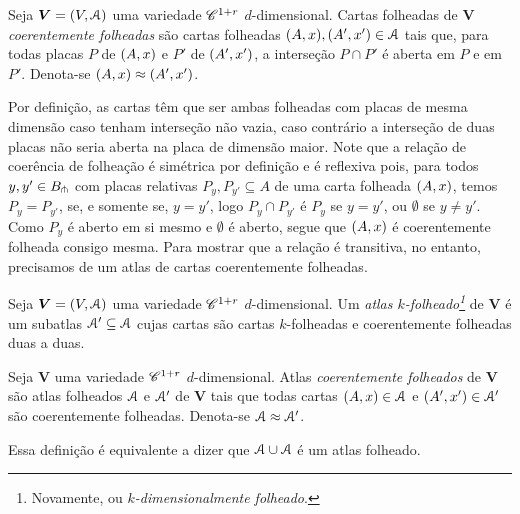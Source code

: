 \begin{definition}
Seja $\bm V = (V,\mathcal{A})$ uma variedade $\mathscr{C}^{1+r}$ $d$-dimensional. Cartas folheadas de $\bm V$ \emph{coerentemente folheadas} são cartas folheadas $(A,x), (A',x') \in \mathcal{A}$ tais que, para todas placas $P$ de $(A,x)$ e $P'$ de $(A',x')$, a interseção $P \cap P'$ é aberta em $P$ e em $P'$. Denota-se $(A,x) \approx (A',x')$.
\end{definition}

Por definição, as cartas têm que ser ambas folheadas com placas de mesma dimensão caso tenham interseção não vazia, caso contrário a interseção de duas placas não seria aberta na placa de dimensão maior. Note que a relação de coerência de folheação é simétrica por definição e é reflexiva pois, para todos $y,y' \in B_{\pitchfork}$ com placas relativas $P_y,P_{y'} \subseteq A$ de uma carta folheada $(A,x)$, temos $P_y = P_{y'}$, se, e somente se, $y=y'$, logo $P_y \cap P_{y'}$ é $P_y$ se $y=y'$, ou $\emptyset$ se $y \neq y'$. Como $P_y$ é aberto em si mesmo e $\emptyset$ é aberto, segue que $(A,x)$ é coerentemente folheada consigo mesma. Para mostrar que a relação é transitiva, no entanto, precisamos de um atlas de cartas coerentemente folheadas.

\begin{definition}
Seja $\bm V = (V,\mathcal{A})$ uma variedade $\mathscr{C}^{1+r}$ $d$-dimensional. Um \emph{atlas $k$-folheado\footnote{Novamente, ou \emph{$k$-dimensionalmente folheado}.}} de $\bm V$ é um subatlas $\mathcal{A}' \subseteq \mathcal{A}$ cujas cartas são cartas $k$-folheadas e coerentemente folheadas duas a duas.
\end{definition}

\begin{definition}
Seja $\bm V$ uma variedade $\mathscr{C}^{1+r}$ $d$-dimensional. Atlas \emph{coerentemente folheados} de $\bm V$ são atlas folheados $\mathcal{A}$ e $\mathcal{A}'$ de $\bm V$ tais que todas cartas $(A,x) \in \mathcal{A}$ e $(A',x') \in \mathcal{A}'$ são coerentemente folheadas. Denota-se $\mathcal{A} \approx \mathcal{A}'$.
\end{definition}

Essa definição é equivalente a dizer que $\mathcal{A} \cup \mathcal{A}$ é um atlas folheado.

